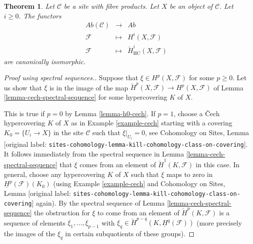\documentclass[10pt,a4paper]{article}
\theoremstyle{plain}
\newtheorem{theorem}[subsection]{Theorem}
\theoremstyle{definition}
\theoremstyle{remark}
\numberwithin{equation}{subsection}
\begin{document}
\begin{theorem}
\label{theorem-cohomology-hypercoverings}
Let $\mathcal{C}$ be a site with fibre products.
Let $X$ be an object of $\mathcal{C}$. Let $i \geq 0$.
The functors
\begin{eqnarray*}
\textit{Ab}(\mathcal{C}) & \longrightarrow & \textit{Ab} \\
\mathcal{F} & \longmapsto & H^i(X, \mathcal{F}) \\
\mathcal{F} & \longmapsto & \check{H}^i_{\text{HC}}(X, \mathcal{F})
\end{eqnarray*}
are canonically isomorphic.
\end{theorem}



\begin{proof}[Proof using spectral sequences.]
Suppose that $\xi \in H^p(X, \mathcal{F})$ for some $p \geq 0$.
Let us show that $\xi$ is in the image of the map
$\check{H}^p(X, \mathcal{F}) \to H^p(X, \mathcal{F})$ of
Lemma \ref{lemma-cech-spectral-sequence}
for some hypercovering $K$ of $X$.

\medskip\noindent
This is true if $p = 0$ by Lemma \ref{lemma-h0-cech}.
If $p = 1$, choose a {\v C}ech hypercovering $K$ of $X$ as in
Example \ref{example-cech} starting with a covering
$K_0 = \{U_i \to X\}$ in the site $\mathcal{C}$ such that
$\xi|_{U_i} = 0$, see
Cohomology on Sites,
Lemma \textnormal{[original label: \nolinkurl{sites-cohomology-lemma-kill-cohomology-class-on-covering}]}.
It follows immediately from the spectral sequence
in Lemma \ref{lemma-cech-spectral-sequence} that $\xi$ comes
from an element of $\check{H}^1(K, \mathcal{F})$ in this case.
In general, choose any hypercovering $K$ of $X$ such
that $\xi$ maps to zero in $\underline{H}^p(\mathcal{F})(K_0)$
(using Example \ref{example-cech} and
Cohomology on Sites,
Lemma \textnormal{[original label: \nolinkurl{sites-cohomology-lemma-kill-cohomology-class-on-covering}]}
again).
By the spectral sequence of Lemma \ref{lemma-cech-spectral-sequence}
the obstruction for $\xi$ to come from an element of
$\check{H}^p(K, \mathcal{F})$ is a sequence of elements
$\xi_1, \ldots, \xi_{p - 1}$ with
$\xi_q \in \check{H}^{p - q}(K, \underline{H}^q(\mathcal{F}))$
(more precisely the images of the $\xi_q$ in certain subquotients
of these groups).


\end{proof}
\end{document}
